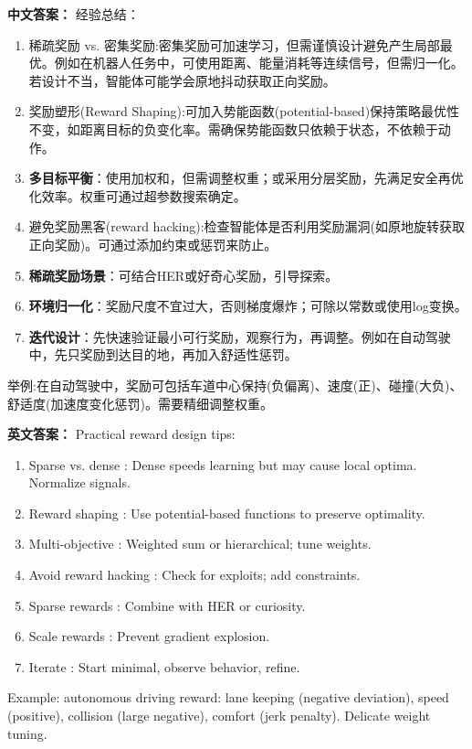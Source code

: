 \documentclass[10pt,a4paper]{ctexart}
\begin{document}
\textbf{中文答案：}  
经验总结：
\begin{enumerate}
    \item 稀疏奖励 vs. 密集奖励:密集奖励可加速学习，但需谨慎设计避免产生局部最优。例如在机器人任务中，可使用距离、能量消耗等连续信号，但需归一化。若设计不当，智能体可能学会原地抖动获取正向奖励。
    \item 奖励塑形(Reward Shaping):可加入势能函数(potential-based)保持策略最优性不变，如距离目标的负变化率。需确保势能函数只依赖于状态，不依赖于动作。
    \item \textbf{多目标平衡}：使用加权和，但需调整权重；或采用分层奖励，先满足安全再优化效率。权重可通过超参数搜索确定。
    \item 避免奖励黑客(reward hacking):检查智能体是否利用奖励漏洞(如原地旋转获取正向奖励)。可通过添加约束或惩罚来防止。
    \item \textbf{稀疏奖励场景}：可结合HER或好奇心奖励，引导探索。
    \item \textbf{环境归一化}：奖励尺度不宜过大，否则梯度爆炸；可除以常数或使用log变换。
    \item \textbf{迭代设计}：先快速验证最小可行奖励，观察行为，再调整。例如在自动驾驶中，先只奖励到达目的地，再加入舒适性惩罚。
\end{enumerate}

 举例:在自动驾驶中，奖励可包括车道中心保持(负偏离)、速度(正)、碰撞(大负)、舒适度(加速度变化惩罚)。需要精细调整权重。

\textbf{英文答案：}  
Practical reward design tips:
\begin{enumerate}
    \item Sparse vs. dense : Dense speeds learning but may cause local optima. Normalize signals.
    \item Reward shaping : Use potential-based functions to preserve optimality.
    \item Multi-objective : Weighted sum or hierarchical; tune weights.
    \item Avoid reward hacking : Check for exploits; add constraints.
    \item Sparse rewards : Combine with HER or curiosity.
    \item Scale rewards : Prevent gradient explosion.
    \item Iterate : Start minimal, observe behavior, refine.
\end{enumerate}

Example: autonomous driving reward: lane keeping (negative deviation), speed (positive), collision (large negative), comfort (jerk penalty). Delicate weight tuning.
\end{document}
